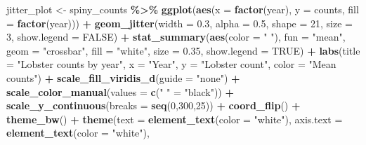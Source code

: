 \documentclass[
]{article}
\newenvironment{Shaded}{\begin{snugshade}}{\end{snugshade}}
\newcommand{\AttributeTok}[1]{\textcolor[rgb]{0.13,0.29,0.53}{#1}}
\newcommand{\ConstantTok}[1]{\textcolor[rgb]{0.56,0.35,0.01}{#1}}
\newcommand{\DecValTok}[1]{\textcolor[rgb]{0.00,0.00,0.81}{#1}}
\newcommand{\FloatTok}[1]{\textcolor[rgb]{0.00,0.00,0.81}{#1}}
\newcommand{\FunctionTok}[1]{\textcolor[rgb]{0.13,0.29,0.53}{\textbf{#1}}}
\newcommand{\NormalTok}[1]{#1}
\newcommand{\OtherTok}[1]{\textcolor[rgb]{0.56,0.35,0.01}{#1}}
\newcommand{\SpecialCharTok}[1]{\textcolor[rgb]{0.81,0.36,0.00}{\textbf{#1}}}
\newcommand{\StringTok}[1]{\textcolor[rgb]{0.31,0.60,0.02}{#1}}
\begin{document}
\begin{Shaded}
\begin{Highlighting}[]
\NormalTok{jitter\_plot }\OtherTok{\textless{}{-}}\NormalTok{ spiny\_counts }\SpecialCharTok{\%\textgreater{}\%}
  \FunctionTok{ggplot}\NormalTok{(}\FunctionTok{aes}\NormalTok{(}\AttributeTok{x =} \FunctionTok{factor}\NormalTok{(year),  }
             \AttributeTok{y =}\NormalTok{ counts, }
             \AttributeTok{fill =} \FunctionTok{factor}\NormalTok{(year))) }\SpecialCharTok{+}  
  \FunctionTok{geom\_jitter}\NormalTok{(}\AttributeTok{width =} \FloatTok{0.3}\NormalTok{,}
              \AttributeTok{alpha =} \FloatTok{0.5}\NormalTok{,}
              \AttributeTok{shape =} \DecValTok{21}\NormalTok{,}
              \AttributeTok{size =} \DecValTok{3}\NormalTok{,}
              \AttributeTok{show.legend =} \ConstantTok{FALSE}\NormalTok{) }\SpecialCharTok{+}  
  \FunctionTok{stat\_summary}\NormalTok{(}\FunctionTok{aes}\NormalTok{(}\AttributeTok{color =} \StringTok{" "}\NormalTok{),}
               \AttributeTok{fun =} \StringTok{"mean"}\NormalTok{,}
               \AttributeTok{geom =} \StringTok{"crossbar"}\NormalTok{,}
               \AttributeTok{fill =} \StringTok{"white"}\NormalTok{,}
               \AttributeTok{size =} \FloatTok{0.35}\NormalTok{,}
               \AttributeTok{show.legend =} \ConstantTok{TRUE}\NormalTok{) }\SpecialCharTok{+}  
  \FunctionTok{labs}\NormalTok{(}\AttributeTok{title =} \StringTok{"Lobster counts by year"}\NormalTok{,}
       \AttributeTok{x =} \StringTok{"Year"}\NormalTok{, }
       \AttributeTok{y =} \StringTok{"Lobster count"}\NormalTok{,}
       \AttributeTok{color =} \StringTok{"Mean counts"}\NormalTok{) }\SpecialCharTok{+}  
  \FunctionTok{scale\_fill\_viridis\_d}\NormalTok{(}\AttributeTok{guide =} \StringTok{"none"}\NormalTok{) }\SpecialCharTok{+} 
  \FunctionTok{scale\_color\_manual}\NormalTok{(}\AttributeTok{values =} \FunctionTok{c}\NormalTok{(}\StringTok{" "} \OtherTok{=} \StringTok{"black"}\NormalTok{)) }\SpecialCharTok{+}  
  \FunctionTok{scale\_y\_continuous}\NormalTok{(}\AttributeTok{breaks =} \FunctionTok{seq}\NormalTok{(}\DecValTok{0}\NormalTok{,}\DecValTok{300}\NormalTok{,}\DecValTok{25}\NormalTok{)) }\SpecialCharTok{+}
  \FunctionTok{coord\_flip}\NormalTok{() }\SpecialCharTok{+} 
  \FunctionTok{theme\_bw}\NormalTok{() }\SpecialCharTok{+}
  \FunctionTok{theme}\NormalTok{(}\AttributeTok{text =} \FunctionTok{element\_text}\NormalTok{(}\AttributeTok{color =} \StringTok{"white"}\NormalTok{),}
        \AttributeTok{axis.text =} \FunctionTok{element\_text}\NormalTok{(}\AttributeTok{color =} \StringTok{"white"}\NormalTok{),}

\end{Highlighting}
\end{Shaded}
\end{document}
